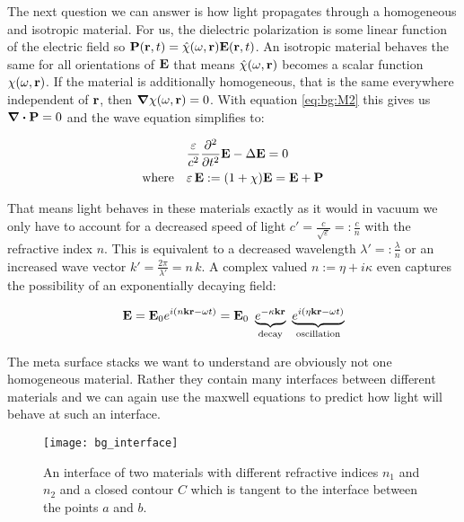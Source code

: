 \label{par:light_in_materials}
The next question we can answer is how light propagates through a homogeneous and isotropic material. For us, the dielectric polarization is some linear function of the electric field so $\vb P(\vb r, t) = \hat{\chi}(\omega, \vb r) \vb E(\vb r, t)$. An isotropic material behaves the same for all orientations of $\vb E$ that means $\hat{\chi}(\omega, \vb r)$ becomes a scalar function $\chi(\omega, \vb r)$. If the material is additionally homogeneous, that is the same everywhere independent of $\vb r$, then $\grad \chi(\omega, \vb r) = 0$. With equation \eqref{eq:bg:M2} this gives us $\div \vb P = 0$
and the wave equation simplifies to:

\begin{equation}
\begin{aligned}
    &\frac{\varepsilon}{c^2} \pdv[2] t \vb E - \Delta \vb E = 0\\
    \qq*{where} &\varepsilon \, \vb E := \qty(1 + \chi) \vb E = \vb E + \vb P
\end{aligned}
\end{equation}

That means light behaves in these materials exactly as it would in vacuum we only have to account for a decreased speed of light
$c' = \frac{c}{\sqrt{\varepsilon}} =: \frac{c}{n}$
with the refractive index $n$.
This is equivalent to a decreased wavelength
$\lambda' =: \frac{\lambda}{n}$
or an increased wave vector
$k' = \frac{2 \pi}{\lambda'} = n \, k$.
A complex valued $n := \eta + i \kappa$ even captures the possibility of an exponentially decaying field:

\begin{equation}
    \vb E = \vb E_0 e^{i(n \vb k \vb r - \omega t)}
    = \vb E_0 \
    \underbrace{e^{-\kappa \vb k \vb r}}_{\mathrm{
    decay}} \
    \underbrace{e^{i(\eta \vb k \vb r - \omega t)}}_{\mathrm{
    oscillation}}
\end{equation}

The meta surface stacks we want to understand are obviously not one homogeneous material. Rather they contain many interfaces between different materials and we can again use the maxwell equations to predict how light will behave at such an interface.
\\

\begin{figure}[H]
    \centering
    \texttt{[image: bg\_interface]}
    \caption{An interface of two materials with different refractive indices $n_1$ and $n_2$ and a closed contour $C$ which is tangent to the interface between the points $a$ and $b$.}
    \label{fig:bg:interface}
\end{figure}

